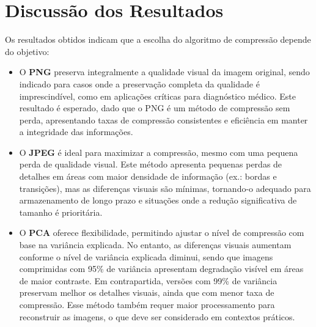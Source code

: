 \begin{figure}[!htbp]
	\centering
\end{figure}

\section{Discussão dos Resultados}

Os resultados obtidos indicam que a escolha do algoritmo de compressão depende do objetivo:

\begin{itemize}
    \item O \textbf{\acrshort{PNG}} preserva integralmente a qualidade visual da imagem original, sendo indicado para casos onde a preservação completa da qualidade é imprescindível, como em aplicações críticas para diagnóstico médico. Este resultado é esperado, dado que o \acrshort{PNG} é um método de compressão sem perda, apresentando taxas de compressão consistentes e eficiência em manter a integridade das informações.
    \item O \textbf{\acrshort{JPEG}} é ideal para maximizar a compressão, mesmo com uma pequena perda de qualidade visual. Este método apresenta pequenas perdas de detalhes em áreas com maior densidade de informação (ex.: bordas e transições), mas as diferenças visuais são mínimas, tornando-o adequado para armazenamento de longo prazo e situações onde a redução significativa de tamanho é prioritária. 
    \item O \textbf{\acrshort{PCA}} oferece flexibilidade, permitindo ajustar o nível de compressão com base na variância explicada. No entanto, as diferenças visuais aumentam conforme o nível de variância explicada diminui, sendo que imagens comprimidas com 95\% de variância apresentam degradação visível em áreas de maior contraste. Em contrapartida, versões com 99\% de variância preservam melhor os detalhes visuais, ainda que com menor taxa de compressão. Esse método também requer maior processamento para reconstruir as imagens, o que deve ser considerado em contextos práticos.
\end{itemize}

